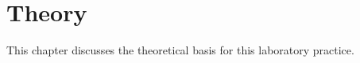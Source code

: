  
\chapter{Theory}
\label{cha:theory}

This chapter discusses the theoretical basis for this laboratory practice.



